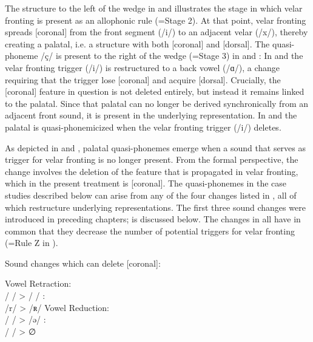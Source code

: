 The structure to the left of the wedge in  and  illustrates the stage in which velar fronting is present as an allophonic rule (=Stage 2). At that point, velar fronting spreads [coronal] from the front segment (/i/) to an adjacent velar (/x/), thereby creating a palatal, i.e. a structure with both [coronal] and  [dorsal]. The quasi-phoneme /ç/ is present to the right of the wedge (=Stage 3) in  and : In  and  the velar fronting trigger (/i/) is restructured to a back vowel (/ɑ/), a change requiring that the trigger lose [coronal] and acquire [dorsal]. Crucially, the [coronal] feature in question is not deleted entirely, but instead it remains linked to the palatal. Since that palatal can no longer be derived synchronically from an adjacent front sound, it is present in the underlying representation. In  and  the palatal is quasi-phonemicized when the velar fronting trigger (/i/) deletes.

As depicted in  and , palatal quasi-phonemes emerge when a sound that serves as trigger for velar fronting is no longer present. From the formal perspective, the change involves the deletion of the feature that is propagated in velar fronting, which in the present treatment is [coronal]. The quasi-phonemes in the case studies described below can arise from any of the four changes listed in , all of which restructure underlying representations. The first three sound changes were introduced in preceding chapters;  is discussed below. The changes in  all have in common that they decrease the number of potential triggers for velar fronting (=Rule Z in ).

\ea%
\label{ex:7:4}Sound changes which can delete [coronal]:
\begin{multicols}{2}\raggedcolumns
\ea\label{ex:7:4a} Vowel Retraction:\smallskip\\
  /  / >
  /  /
\ex\label{ex:7:4b} :\smallskip\\
  /r/ > /ʀ/
\ex\label{ex:7:4c} Vowel Reduction:\smallskip\\
 /  / > /ə/
\ex\label{ex:7:4d} :\smallskip\\
 /  / > ∅
\z
\end{multicols}
\z 


